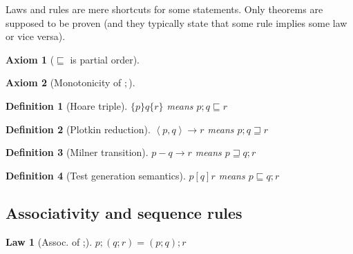 \documentclass{article}
\begin{document}
\newcommand{\refines}{\sqsubseteq}
\newcommand{\refinedby}{\sqsupseteq}
\newcommand{\eps}{\varepsilon}

\newcommand{\verified}{{\color{green}Verified.}}



\newcommand{\plotkin}[3]{\left< #1, #2 \right> \rightarrow #3}
\newcommand{\milner}[3]{#1-#2\rightarrow #3}


\newtheorem{axiom}{Axiom}
\newtheorem{law}{Law}
\newtheorem{rul}{Rule} %
\newtheorem{theorem}{Theorem}
\newtheorem{lemma}{Lemma}
\newtheorem{definition}{Definition}

Laws and rules are mere shortcuts for some statements.
Only theorems are supposed to be proven (and they typically state that
some rule implies some law or vice versa).


\begin{axiom} [$\refines$ is partial order]
\end{axiom}

\begin{axiom} [Monotonicity of $;$]
\end{axiom}


\begin{definition} [Hoare triple]
$\{p\}q\{r\}$ means $p;q \refines r$
\end{definition}

\begin{definition} [Plotkin reduction]
$\plotkin{p}{q}{r}$ means $p; q \refinedby r$
\end{definition}

\begin{definition} [Milner transition]
$\milner{p}{q}{r}$ means $p \refinedby q; r$
\end{definition}

\begin{definition} [Test generation semantics]
$p[q]r$ means $p \refines q;r$
\end{definition}


\subsection*{Associativity and sequence rules}

\begin{law}[Assoc. of ;]
$p;(q;r) = (p;q);r$
\end{law}
\end{document}
